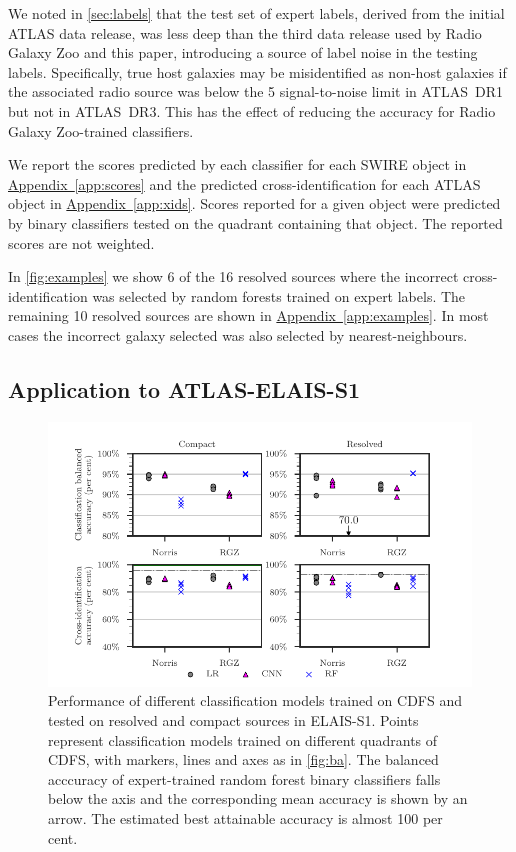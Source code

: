 \documentclass[fleqn,usenatbib,usedcolumn]{mnras}
\newcommand{\edited}[1]{#1}
\newcommand{\aref}[1]{\hyperref[#1]{Appendix~\ref{#1}}}
\begin{document}
    We noted in \autoref{sec:labels} that the test set of expert labels,
    derived from the initial ATLAS data release, was less deep than the third
    data release used by Radio Galaxy Zoo and this paper, introducing a source
    of label noise in the testing labels. Specifically, true host galaxies may
    be misidentified as non-host galaxies if the associated radio source was
    below the 5 signal-to-noise limit in ATLAS~DR1 but not in ATLAS~DR3. This
    has the effect of reducing the accuracy for Radio Galaxy Zoo-trained
    classifiers.

    \edited{We report the scores predicted by each classifier for each
    SWIRE object in \aref{app:scores} and the predicted
    cross-identification for each ATLAS object in \aref{app:xids}.
    Scores reported for a given object were predicted by binary
    classifiers tested on the quadrant containing that object. The reported scores are not weighted.}

    In \autoref{fig:examples} we show 6 of the 16 resolved sources where the
    incorrect cross-identification was selected by random forests trained on
    expert labels. The remaining 10 resolved sources are shown in \aref{app:examples}.
    In most cases the incorrect galaxy selected was also selected by
    nearest-neighbours.

\subsection{Application to ATLAS-ELAIS-S1}
  \label{sec:elais}

  \begin{figure}
  \centering
  \includegraphics[]{images/elais-grid-new.pdf}
  \caption{Performance of different classification models trained on CDFS and tested on
  resolved and compact sources in ELAIS-S1. Points represent classification models
  trained on different quadrants of CDFS, with markers, lines and axes as in
  \autoref{fig:ba}. The balanced acccuracy of expert-trained random forest
  binary classifiers falls below the axis and the corresponding mean accuracy is
  shown by an arrow. The estimated best attainable accuracy is almost 100 per cent.
    \label{fig:elais-ba}}
  \end{figure}
\end{document}

